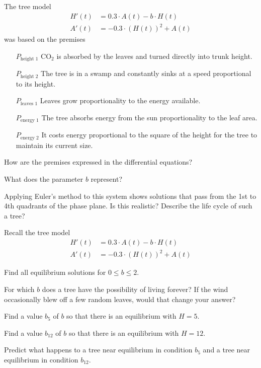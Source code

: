 \documentclass{workbook}
\begin{document}
\begin{slide}
	\question
	The tree model
	\begin{align*}
		H'(t) &= 0.3\cdot A(t)-b\cdot H(t)\\
		A'(t) &= -0.3\cdot (H(t))^2 + A(t)
	\end{align*}
	was based on the premises
	\begin{itemize}[leftmargin=3em]
		\item[ $P_{\text{height 1}}$] CO$_2$ is absorbed by the leaves and turned directly into trunk height.
		\item[ $P_{\text{height 2}}$] The tree is in a swamp and constantly sinks at a speed proportional to its height.
		\item[ $P_{\text{leaves 1}}$] Leaves grow proportionality to the energy available.
		\item[ $P_{\text{energy 1}}$] The tree absorbs energy from the sun proportionality to the leaf area.
		\item[ $P_{\text{energy 2}}$] It costs energy proportional to the square of the height for the tree to maintain its current size.
	\end{itemize}

	\begin{parts}
		\item How are the premises expressed in the differential equations?
		\item What does the parameter $b$ represent?
		\item Applying Euler's method to this system shows solutions that pass from the 1st to 4th quadrants of the phase plane.
			Is this realistic? Describe the life cycle of such a tree?
	\end{parts}
\end{slide}

\begin{slide}
	\question
	Recall the tree model
	\begin{align*}
		H'(t) &= 0.3\cdot A(t)-b\cdot H(t)\\
		A'(t) &= -0.3\cdot (H(t))^2 + A(t)
	\end{align*}

	\begin{parts}
		\item Find all equilibrium solutions for $0\leq b\leq 2$.
		\item For which $b$ does a tree have the possibility of living forever? If the wind occasionally blew off a few random leaves,
		would that change your answer?
		\item
		Find a value $b_5$ of $b$ so that there is an equilibrium with $H=5$.

		Find a value $b_{12}$ of $b$ so that there is an equilibrium with $H=12$.
		
		\item
		Predict what happens to a tree near equilibrium in condition $b_5$ and a tree near equilibrium in condition $b_{12}$.

	\end{parts}
\end{slide}
\end{document}

